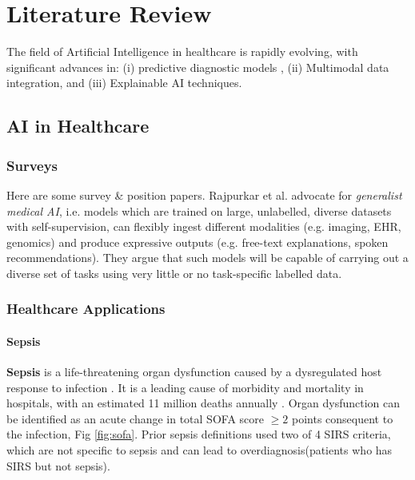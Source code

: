 \chapter{Literature Review}
The field of Artificial Intelligence in healthcare is rapidly evolving, with significant advances in: (i) predictive diagnostic models \cite{optimizing_ai_sepsis_2024}, (ii) Multimodal data integration, and (iii) Explainable AI techniques. 

\section{AI in Healthcare}

\subsection{Surveys}
Here are some survey \& position papers. Rajpurkar et al. \cite{moor2023GMAI} advocate for \textit{generalist medical AI}, i.e. models which are trained on large, unlabelled, diverse datasets with self-supervision, can flexibly ingest different modalities (e.g. imaging, EHR, genomics) and produce expressive outputs (e.g. free-text explanations, spoken recommendations). They argue that such models will be capable of carrying out a diverse set of tasks using very little or no task-specific labelled data.



\subsection{Healthcare Applications}
\label{sec:healthcare_applications}

\subsubsection{Sepsis}
\label{sec:sepsis}
\textbf{Sepsis}  is a life-threatening organ dysfunction caused by a dysregulated host response to infection \cite{singer2016sepsis3}. It is a leading cause of morbidity and mortality in hospitals, with an estimated 11 million deaths annually \cite{rudd2020global}. Organ dysfunction can be identified as an acute change in total SOFA score
$\geq 2$ points consequent to the infection, Fig \ref{fig:sofa}. Prior sepsis definitions used two of 4 SIRS criteria, which are not specific to sepsis and can lead to overdiagnosis(patients who has SIRS but not sepsis).


